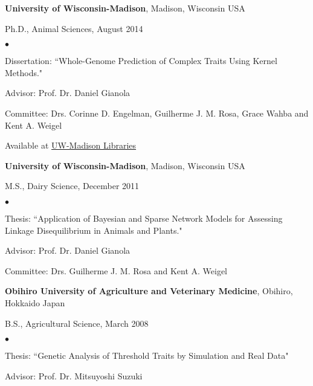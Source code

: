 \documentclass[margin,line,10pt]{res}
\newenvironment{list1}{
  \begin{list}{\ding{113}}{%
      \setlength{\itemsep}{0in}
      \setlength{\parsep}{0in} \setlength{\parskip}{0in}
      \setlength{\topsep}{0in} \setlength{\partopsep}{0in} 
      \setlength{\leftmargin}{0.17in}}}{\end{list}}
\newenvironment{list2}{
  \begin{list}{$\bullet$}{%
      \setlength{\itemsep}{0in}
      \setlength{\parsep}{0in} \setlength{\parskip}{0in}
      \setlength{\topsep}{0in} \setlength{\partopsep}{0in} 
      \setlength{\leftmargin}{0.2in}}}{\end{list}}
\begin{document}
\begin{resume}
{\bf University of Wisconsin-Madison}, Madison, Wisconsin USA\\
\vspace*{-.1in}
\begin{list1}
\item[] Ph.D., Animal Sciences, August 2014
\begin{list2}
\vspace*{.05in}
\item Dissertation: ``Whole-Genome Prediction of Complex Traits Using Kernel Methods." 
\item Advisor: Prof. Dr. Daniel Gianola 
\item Committee: Drs. Corinne D. Engelman, Guilherme J. M. Rosa, Grace Wahba and Kent A. Weigel
\item Available at  \textcolor{blue}{\href{https://search.library.wisc.edu/catalog/9910205835702121}{UW-Madison Libraries}} 
\end{list2}
\vspace*{.05in}
\end{list1}





{\bf University of Wisconsin-Madison}, Madison, Wisconsin USA\\
\vspace*{-.1in}
\begin{list1}
\item[] M.S., Dairy Science, December 2011
\begin{list2}
\vspace*{.05in}
\item Thesis: ``Application of Bayesian and Sparse Network Models for Assessing Linkage Disequilibrium in Animals and Plants." 
\item Advisor: Prof. Dr. Daniel Gianola 
\item Committee: Drs. Guilherme J. M. Rosa and Kent A. Weigel
\end{list2}
\vspace*{.05in}
\end{list1}


{\bf Obihiro University of Agriculture and Veterinary Medicine}, Obihiro, Hokkaido Japan\\
\vspace*{-.1in}
\begin{list1}
\item[] B.S., Agricultural Science,  March 2008
\begin{list2}
\vspace*{.05in}
\item Thesis:  ``Genetic Analysis of Threshold Traits by Simulation and Real Data" 
\item Advisor: Prof. Dr. Mitsuyoshi Suzuki
\end{list2}
\end{list1}





\end{resume}
\end{document}
